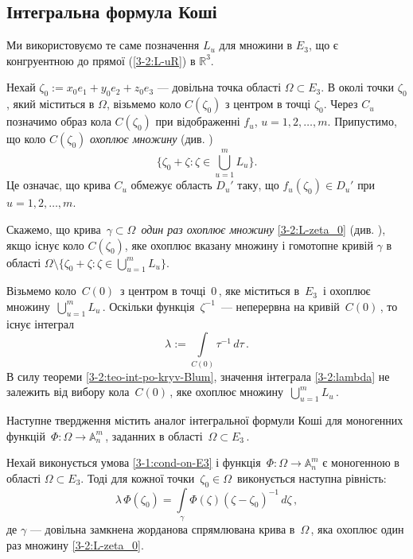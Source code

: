 \documentclass[11pt, reqno]{amsart}
\begin{document}
\subsection{Інтегральна формула Коші}

Ми використовуємо те саме позначення $L_u$ для множини в $E_3$, що є
конгруентною до прямої (\ref{3-2:L-uR}) в $\mathbb{R}^{3}$.

Нехай $\zeta_0:=x_0e_1+y_0e_2+z_0e_3$ --- довільна точка області
$\Omega\subset E_3$. В околі точки $\zeta_0$, який міститься
в $\Omega$, візьмемо коло $C(\zeta_0)$ з центром в точці
 $\zeta_0$. Через $C_u$ позначимо образ кола $C(\zeta_0)$ при відображенні $f_u$,
$u=1,2,\ldots,m$. Припустимо, що коло $C(\zeta_0)$
\emph{охоплює множину} (див. \cite{Pukh-5})
\begin{equation}\label{3-2:L-zeta_0}
\Big\{\zeta_0+\zeta: \zeta\in\bigcup\limits_{u=1}^m L_u\Big\}.
\end{equation}
 Це означає, що крива
$C_u$ обмежує область $D_u'$ таку, що
$f_u(\zeta_0)\in D_u'$ при\, $u=1,2,\ldots,m$.

Скажемо, що крива\, $\gamma\subset\Omega$\, \emph{один раз
охоплює множину} \eqref{3-2:L-zeta_0} (див. \cite{Pukh-5}), якщо існує коло $C(\zeta_0)$, яке охоплює
вказану множину і гомотопне кривій  $\gamma$ в області
$\Omega\setminus\Big\{\zeta_0+\zeta: \zeta\in\bigcup\limits_{u=1}^m
L_u\Big\}$.


Візьмемо коло\, $C(0)$\, з центром в точці\, $0$\,, яке міститься в\, $E_3$\, і охоплює
множину\, $\bigcup\limits_{u=1}^m L_u$\,.
Оскільки функція\, $\zeta^{-1}$\, --- неперервна на кривій\,
$C(0)$\,, то існує інтеграл
\begin{equation}\label{3-2:lambda}
\lambda:=\int\limits_{C(0)}\tau^{-1}\,d\tau\,.
\end{equation}
В силу теореми \ref{3-2:teo-int-po-kryv-Blum}, значення інтеграла \eqref{3-2:lambda} не залежить від вибору
кола\, $C(0)$\,, яке охоплює множину\, $\bigcup\limits_{u=1}^m L_u$\,.


Наступне твердження містить аналог інтегральної формули Коші для моногенних функцій\,
$\Phi:\Omega\rightarrow\mathbb{A}_{n}^m$\,, заданних в області\, $\Omega\subset E_3$\,.

\vskip 1mm

\begin{theorem}\label{teo-formula-Koshi-3-2}
Нехай виконується умова \eqref{3-1:cond-on-E3} і функція\, $\Phi:\Omega\rightarrow\mathbb{A}_n^m$ є моногенною
в області $\Omega\subset E_3$. Тоді для кожної точки\, $\zeta_{0}\in\Omega$\,
виконується наступна рівність:
\begin{equation}\label{3-2:form-Koshi-3-2}
\lambda\,\Phi(\zeta_{0})=
\int\limits_{\gamma}\Phi(\zeta)\left(\zeta-\zeta_{0}\right)^{-1}\,d\zeta\,,
\end{equation}
де $\gamma$ --- довільна замкнена жорданова спрямлювана крива в\, $\Omega$\,,
яка охоплює один раз множину \eqref{3-2:L-zeta_0}.
\end{theorem}
\end{document}
